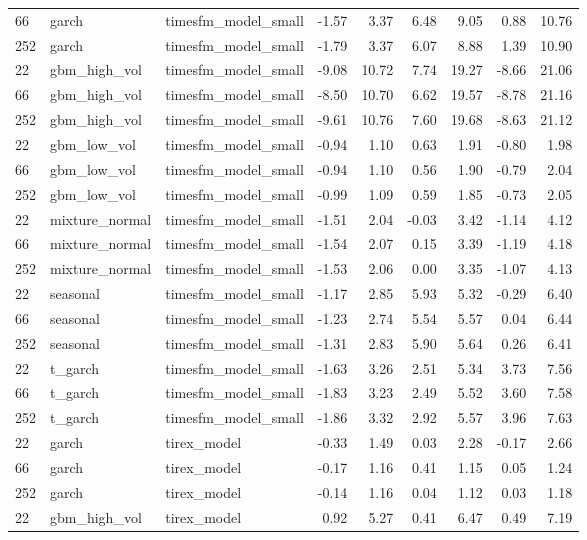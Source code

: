 {\begin{tabular}{lllrrrrrr}
66 & garch & timesfm\_model\_small & -1.57 & 3.37 & 6.48 & 9.05 & 0.88 & 10.76 \\
252 & garch & timesfm\_model\_small & -1.79 & 3.37 & 6.07 & 8.88 & 1.39 & 10.90 \\
\midrule
22 & gbm\_high\_vol & timesfm\_model\_small & -9.08 & 10.72 & 7.74 & 19.27 & -8.66 & 21.06 \\
66 & gbm\_high\_vol & timesfm\_model\_small & -8.50 & 10.70 & 6.62 & 19.57 & -8.78 & 21.16 \\
252 & gbm\_high\_vol & timesfm\_model\_small & -9.61 & 10.76 & 7.60 & 19.68 & -8.63 & 21.12 \\
\midrule
22 & gbm\_low\_vol & timesfm\_model\_small & -0.94 & 1.10 & 0.63 & 1.91 & -0.80 & 1.98 \\
66 & gbm\_low\_vol & timesfm\_model\_small & -0.94 & 1.10 & 0.56 & 1.90 & -0.79 & 2.04 \\
252 & gbm\_low\_vol & timesfm\_model\_small & -0.99 & 1.09 & 0.59 & 1.85 & -0.73 & 2.05 \\
\midrule
22 & mixture\_normal & timesfm\_model\_small & -1.51 & 2.04 & -0.03 & 3.42 & -1.14 & 4.12 \\
66 & mixture\_normal & timesfm\_model\_small & -1.54 & 2.07 & 0.15 & 3.39 & -1.19 & 4.18 \\
252 & mixture\_normal & timesfm\_model\_small & -1.53 & 2.06 & 0.00 & 3.35 & -1.07 & 4.13 \\
\midrule
22 & seasonal & timesfm\_model\_small & -1.17 & 2.85 & 5.93 & 5.32 & -0.29 & 6.40 \\
66 & seasonal & timesfm\_model\_small & -1.23 & 2.74 & 5.54 & 5.57 & 0.04 & 6.44 \\
252 & seasonal & timesfm\_model\_small & -1.31 & 2.83 & 5.90 & 5.64 & 0.26 & 6.41 \\
\midrule
22 & t\_garch & timesfm\_model\_small & -1.63 & 3.26 & 2.51 & 5.34 & 3.73 & 7.56 \\
66 & t\_garch & timesfm\_model\_small & -1.83 & 3.23 & 2.49 & 5.52 & 3.60 & 7.58 \\
252 & t\_garch & timesfm\_model\_small & -1.86 & 3.32 & 2.92 & 5.57 & 3.96 & 7.63 \\
\midrule
22 & garch & tirex\_model & -0.33 & 1.49 & 0.03 & 2.28 & -0.17 & 2.66 \\
66 & garch & tirex\_model & -0.17 & 1.16 & 0.41 & 1.15 & 0.05 & 1.24 \\
252 & garch & tirex\_model & -0.14 & 1.16 & 0.04 & 1.12 & 0.03 & 1.18 \\
\midrule
22 & gbm\_high\_vol & tirex\_model & 0.92 & 5.27 & 0.41 & 6.47 & 0.49 & 7.19 \\

\end{tabular}}
